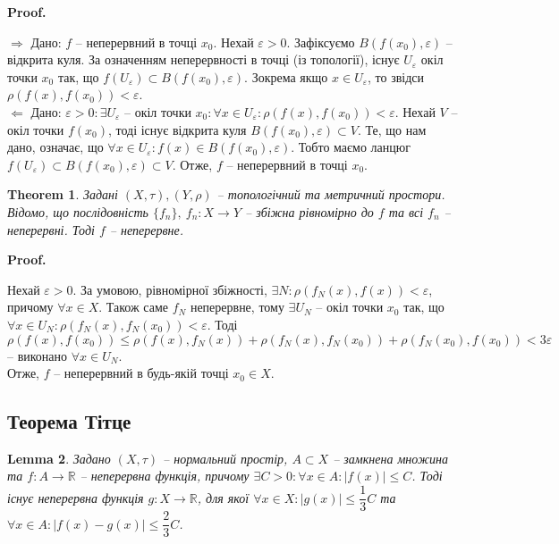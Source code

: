 \documentclass[a4paper, 10pt]{article}
\makeatletter
\def\rightproof{$\boxed{\Rightarrow}$ }
\def\leftproof{$\boxed{\Leftarrow}$ }
\theoremstyle{theoremdd}
\newtheorem{theorem}{Theorem}[subsection]
\newtheorem{lemma}[theorem]{Lemma}
\renewenvironment{proof}[1][Proof.\\]{\par
\pushQED{\hfill \qed}%
\normalfont \topsep6\p@\@plus6\p@\relax
\trivlist
\item\relax
{\bfseries
#1\@addpunct{.}}\hspace\labelsep\ignorespaces
}{%
\popQED\endtrivlist\@endpefalse
}
\makeatother
\begin{document}
\begin{proof}
\rightproof Дано: $f$ -- неперервний в точці $x_0$. Нехай $\varepsilon > 0$. Зафіксуємо $B(f(x_0), \varepsilon)$ -- відкрита куля. За означенням неперервності в точці (із топології), існує $U_\varepsilon$ окіл точки $x_0$ так, що $f(U_\varepsilon) \subset B(f(x_0), \varepsilon)$. Зокрема якщо $x \in U_\varepsilon$, то звідси $\rho(f(x),f(x_0)) < \varepsilon$.
\bigskip \\
\leftproof Дано: $\varepsilon > 0: \exists U_\varepsilon$ -- окіл точки $x_0: \forall x \in U_\varepsilon: \rho(f(x),f(x_0)) < \varepsilon$. Нехай $V$ -- окіл точки $f(x_0)$, тоді існує відкрита куля $B(f(x_0),\varepsilon) \subset V$. Те, що нам дано, означає, що $\forall x \in U_\varepsilon: f(x) \in B(f(x_0),\varepsilon)$. Тобто маємо ланцюг $f(U_\varepsilon) \subset B(f(x_0),\varepsilon) \subset V$. Отже, $f$ -- неперервний в точці $x_0$.
\end{proof}

\begin{theorem}
Задані $(X,\tau), (Y,\rho)$ -- топологічний та метричний простори. Відомо, що послідовність $\{f_n\},\ f_n \colon X \to Y$ -- збіжна рівномірно до $f$ та всі $f_n$ -- неперервні. Тоді $f$ -- неперервне.
\end{theorem}

\begin{proof}
Нехай $\varepsilon > 0$. За умовою, рівномірної збіжності, $\exists N: \rho(f_N(x),f(x)) < \varepsilon$, причому $\forall x \in X$. Також саме $f_N$ неперервне, тому $\exists U_N$ -- окіл точки $x_0$ так, що $\forall x \in U_N: \rho(f_N(x), f_N(x_0)) < \varepsilon$. Тоді\\
$\rho(f(x),f(x_0)) \leq \rho(f(x),f_N(x)) + \rho(f_N(x), f_N(x_0)) + \rho(f_N(x_0), f(x_0)) < 3 \varepsilon$ -- виконано $\forall x \in U_N$.\\
Отже, $f$ -- неперервний в будь-якій точці $x_0 \in X$.
\end{proof}

\subsection{Теорема Тітце}
\begin{lemma}
Задано $(X,\tau)$ -- нормальний простір, $A \subset X$ -- замкнена множина та $f \colon A \to \mathbb{R}$ -- неперервна функція, причому $\exists C > 0: \forall x \in A: |f(x)| \leq C$. Тоді існує неперервна функція $g \colon X \to \mathbb{R}$, для якої $\forall x \in X: |g(x)| \leq \dfrac{1}{3}C$ та $\forall x \in A: |f(x) - g(x)| \leq \dfrac{2}{3}C$.
\end{lemma}
\end{document}
